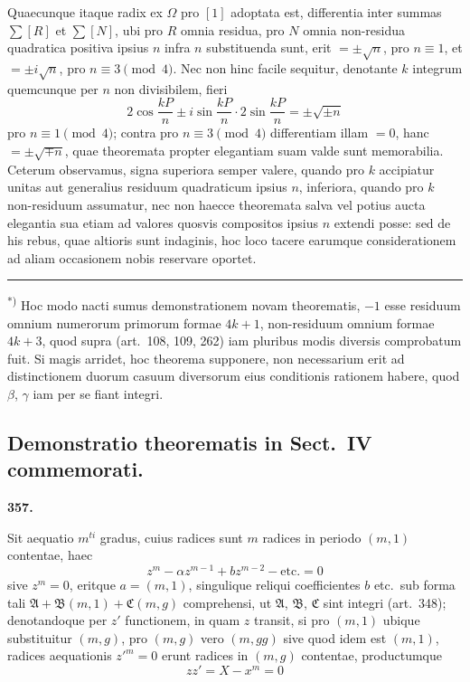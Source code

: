 \documentclass[12pt,a4paper]{article}
\theoremstyle{plain}
\theoremstyle{definition}
\theoremstyle{remark}
\begin{document}
\vspace{0.5em}
\noindent Quaecunque itaque radix ex $\Omega$ pro $[1]$ adoptata est, differentia inter summas $\sum [R]$ et $\sum [N]$, ubi pro $R$ omnia residua, pro $N$ omnia non-residua quadratica positiva ipsius $n$ infra $n$ substituenda sunt, erit $= \pm\sqrt{n}$, pro $n \equiv 1$, et $= \pm i\sqrt{n}$, pro $n \equiv 3 \pmod{4}$. Nec non hinc facile sequitur, denotante $k$ integrum quemcunque per $n$ non divisibilem, fieri
\[
2\cos\frac{kP}{n} \pm i\sin\frac{kP}{n} \cdot 2\sin\frac{kP}{n} = \pm\sqrt{\pm n}
\]
pro $n \equiv 1 \pmod{4}$; contra pro $n \equiv 3 \pmod{4}$ differentiam illam $= 0$, hanc $= \pm\sqrt{\mp n}$, quae theoremata propter elegantiam suam valde sunt memorabilia. Ceterum observamus, signa superiora semper valere, quando pro $k$ accipiatur unitas aut generalius residuum quadraticum ipsius $n$, inferiora, quando pro $k$ non-residuum assumatur, nec non haecce theoremata salva vel potius aucta elegantia sua etiam ad valores quosvis compositos ipsius $n$ extendi posse: sed de his rebus, quae altioris sunt indaginis, hoc loco tacere earumque considerationem ad aliam occasionem nobis reservare oportet.

\vspace{1em}
\noindent\rule{4cm}{0.4pt}

\noindent\textsuperscript{*)} Hoc modo nacti sumus demonstrationem novam theorematis, $-1$ esse residuum omnium numerorum primorum formae $4k+1$, non-residuum omnium formae $4k+3$, quod supra (art.\ 108, 109, 262) iam pluribus modis diversis comprobatum fuit. Si magis arridet, hoc theorema supponere, non necessarium erit ad distinctionem duorum casuum diversorum eius conditionis rationem habere, quod $\beta$, $\gamma$ iam per se fiant integri.


\subsection*{Demonstratio theorematis in Sect.\ IV commemorati.}

\begin{center}
\textbf{357.}
\end{center}

Sit aequatio $m^{ti}$ gradus, cuius radices sunt $m$ radices in periodo $(m,1)$ contentae, haec
\[z^m - \alpha z^{m-1} + b z^{m-2} - \text{etc.} = 0\]
sive $z^m = 0$, eritque $a = (m,1)$, singulique reliqui coefficientes $b$ etc.\ sub forma tali $\mathfrak{A} + \mathfrak{B}(m,1) + \mathfrak{C}(m,g)$ comprehensi, ut $\mathfrak{A}$, $\mathfrak{B}$, $\mathfrak{C}$ sint integri (art.\ 348); denotandoque per $z'$ functionem, in quam $z$ transit, si pro $(m,1)$ ubique substituitur $(m,g)$, pro $(m,g)$ vero $(m,gg)$ sive quod idem est $(m,1)$, radices aequationis $z'^m = 0$ erunt radices in $(m,g)$ contentae, productumque
\[zz' = X - x^m = 0\]
\end{document}
